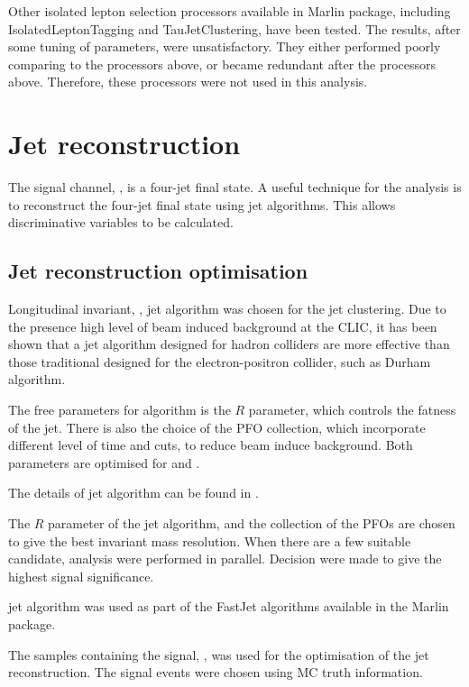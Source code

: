 Other isolated lepton selection processors available in Marlin package, including IsolatedLeptonTagging and TauJetClustering, have been tested. The results, after some tuning of parameters, were unsatisfactory. They either performed poorly comparing to the processors above, or became redundant after the processors above. Therefore, these processors were not used in this analysis.

\section{Jet reconstruction}

The signal channel, \eeToHHbbWWHad, is a four-jet final state. A useful technique for the analysis is to reconstruct the four-jet final state using jet algorithms. This allows discriminative variables to be calculated.

\subsection{Jet reconstruction optimisation}
\label{sec:doubleHiggsJetOptimisation}
Longitudinal invariant, \kt, jet algorithm was chosen for the jet clustering. Due to the presence high level of beam induced background at the CLIC, it has been shown that a jet algorithm designed for hadron colliders are more effective than those traditional designed for the electron-positron collider, such as Durham algorithm.\cite{}

The free parameters for \kt algorithm is the $R$ parameter, which controls the fatness of the jet. There is also the choice of the PFO collection, which incorporate different level of time and \pT cuts, to reduce beam induce background. Both parameters are optimised for  and .

The details of jet algorithm can be found in \Section{}.

The $R$ parameter of the \kt jet algorithm, and the collection of the PFOs are chosen to give the best invariant mass resolution. When there are a few suitable candidate, analysis were performed in parallel. Decision were made to give the highest signal significance.

\kt jet algorithm was used as part of the FastJet algorithms available in the Marlin package.

The samples containing the signal, \eeToHHbbWWHad, was used for the optimisation of the jet reconstruction. The signal events were chosen using MC truth information.


